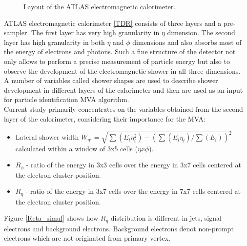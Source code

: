 \begin{figure}[htbp]
\caption{Layout of the ATLAS electromagnetic calorimeter.}
\label{calocells}
\end{figure}
ATLAS electromagnetic calorimeter \ref{TDR} consists of three layers and a pre-sampler. The first layer has very high granularity in $\eta$ dimension. The second layer has high granularity in both $\eta$ and $\phi$ dimensions and also absorbs most of the energy of electrons and photons. Such a fine structure of the detector not only allows to perform a precise measurement of particle energy but also to observe the development of the electromagnetic shower in all three dimensions. \\
A number of variables called shower shapes are used to describe shower development in different layers of the calorimeter and then are used as an input for particle identification MVA algorithm.\\
Current study primarily concentrates on the variables obtained from the second layer of the calorimeter, considering their importance for the MVA:
\begin{itemize}
\item Lateral shower width $W_{\eta^2} = \sqrt{\sum(E_i \eta^{2}_{i})-(\sum(E_i \eta_{i})/\sum(E_i))^2}$ calculated within a window of 3x5 cells ($\eta x \phi$).
\item $R_{\phi}$ - ratio of the energy in 3x3 cells over the energy in 3x7 cells centered at the electron cluster position.
\item $R_{\eta}$ - ratio of the energy in 3x7 cells over the energy in 7x7 cells centered at the electron cluster position.
\end{itemize}
Figure \ref{Reta_simul} shows how $R_{\eta}$ distribution is different in jets, signal electrons and background electrons. Background electrons denot non-prompt electrons which are not originated from primary vertex.\\
